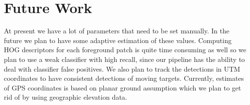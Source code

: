\documentclass[runningheads]{llncs}
\begin{document}
\section{Future Work}

At present we have a lot of parameters that need to be set manually. In the future we plan to have some adaptive estimation of these values. Computing HOG descriptors for each foreground patch is quite time consuming as well so we plan to use a weak classifier with high recall,  since our pipeline has the ability to deal with classifier false positives. We also plan to track the detections in UTM coordinates to have consistent detections of moving targets. Currently, estimates of GPS coordinates is based on planar ground assumption which we plan to get rid of by using geographic elevation data.


\nocite{bal:cha:gra:pae}


\end{document}
